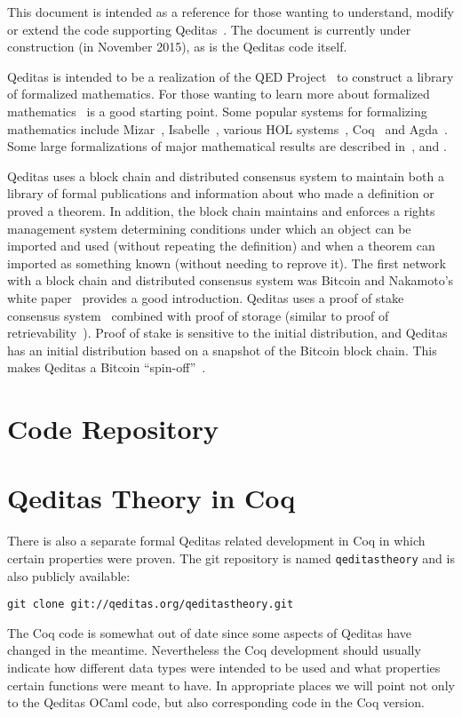 This document is intended as a reference
for those wanting to understand, modify or extend the
code supporting Qeditas~\cite{White2015c}.
The document is currently under construction (in November 2015),
as is the Qeditas code itself.

Qeditas is intended to be a realization of the QED Project~\cite{QED}
to construct a library of formalized mathematics.
For those wanting to learn more about formalized
mathematics~\cite{Barendregt2005} is a good starting point.
Some popular systems for formalizing mathematics include
Mizar~\cite{RudnickiTrybulec2001},
Isabelle~\cite{Nipkow-Paulson-Wenzel:2002},
various HOL systems~\cite{Gordon91,harrison-hollight},
Coq~\cite{Coq:manual} and
Agda~\cite{Norell08}.
Some large formalizations of major mathematical results
are described in~\cite{Gonthier2007}, \cite{Gonthier2013}
and
\cite{Flyspeck2015}.

Qeditas uses a block chain and distributed consensus system to maintain both a library
of formal publications
and information about who made a definition or proved a theorem.
In addition, the block chain maintains and enforces a rights management
system determining conditions under which an object can be imported and used
(without repeating the definition)
and when a theorem can imported as something known (without needing to reprove it).
The first network with a block chain and distributed consensus system
was Bitcoin and Nakamoto's white paper~\cite{Nakamoto2008} provides a good introduction.
Qeditas uses a proof of stake consensus system~\cite{ProofOfStakeDefinite}
combined with proof of storage (similar to proof of retrievability~\cite{MillerJSPK14}).
Proof of stake is sensitive to the initial distribution, and Qeditas
has an initial distribution based on a snapshot of the Bitcoin block chain.
This makes Qeditas a Bitcoin ``spin-off''~\cite{Spinoff,PreSpinoff}.

\section{Code Repository}



\section{Qeditas Theory in Coq}

There is also a separate formal Qeditas related development in Coq
in which certain properties were proven.
The git repository is named {\tt{qeditastheory}}
and is also publicly available:
\begin{verbatim}
git clone git://qeditas.org/qeditastheory.git
\end{verbatim}
The Coq code is somewhat out of date since some aspects of Qeditas have changed
in the meantime. Nevertheless the Coq development should usually indicate how
different data types were intended to be used and what properties certain functions
were meant to have. In appropriate places we will point not only to the Qeditas
OCaml code, but also corresponding code in the Coq version.

